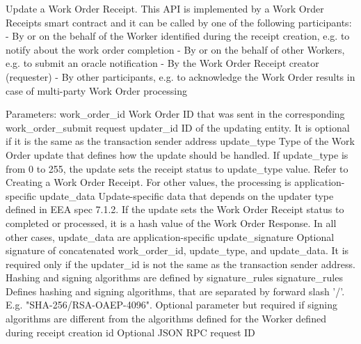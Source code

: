 \begin{DoxyVerb}Update a Work Order Receipt.
This API is implemented by a Work Order Receipts smart contract and
it can be called by one of the following participants:
- By or on the behalf of the Worker identified during the receipt
creation, e.g. to notify about the work order completion
- By or on the behalf of other Workers, e.g. to submit an oracle
notification
- By the Work Order Receipt creator (requester)
- By other participants, e.g. to acknowledge the Work Order results
in case of multi-party Work Order processing

Parameters:
work_order_id    Work Order ID that was sent in the
         corresponding work_order_submit request
updater_id       ID of the updating entity. It is optional if it
         is the same as the transaction sender address
update_type      Type of the Work Order update that defines
         how the update should be handled.
         If update_type is from 0 to 255, the update sets
         the receipt status to update_type value. Refer to
         Creating a Work Order Receipt. For other values,
         the processing is application-specific
update_data      Update-specific data that depends on the
         updater type defined in EEA spec 7.1.2.
         If the update sets the Work Order Receipt status
         to completed or processed, it is a hash value of
         the Work Order Response. In all other
         cases, update_data are application-specific
update_signature Optional signature of concatenated
         work_order_id, update_type, and update_data.
         It is required only if the updater_id is not the
         same as the transaction sender address. Hashing and
         signing algorithms are defined by signature_rules
signature_rules  Defines hashing and signing algorithms,
         that are separated by forward slash '/'.
         E.g. "SHA-256/RSA-OAEP-4096". Optional parameter
         but required if signing algorithms are different
         from the algorithms defined for the Worker defined
         during receipt creation
id               Optional JSON RPC request ID
\end{DoxyVerb}
 \mbox{\label{classavalon__sdk_1_1connector_1_1interfaces_1_1work__order__receipt_1_1WorkOrderReceipt_adbe2f408a3c771bfe9b00a061f66cfc7}} 
